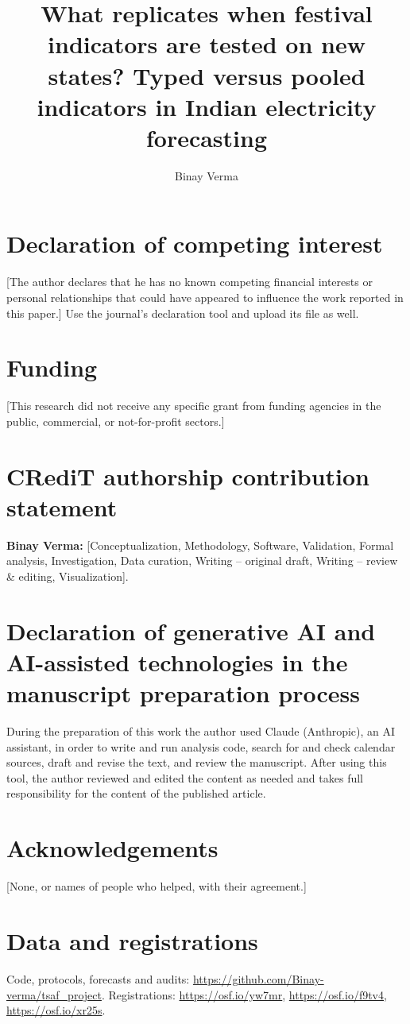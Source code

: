 \documentclass[preprint,12pt,authoryear]{elsarticle}
\begin{document}
\begin{frontmatter}
\title{What replicates when festival indicators are tested on new states? Typed versus pooled indicators in Indian electricity forecasting}
\author{Binay Verma}
\end{frontmatter}
\section*{Declaration of competing interest}
[The author declares that he has no known competing financial interests or personal relationships that could have appeared to influence the work reported in this paper.] Use the journal's declaration tool and upload its file as well.
\section*{Funding}
[This research did not receive any specific grant from funding agencies in the public, commercial, or not-for-profit sectors.]
\section*{CRediT authorship contribution statement}
\textbf{Binay Verma:} [Conceptualization, Methodology, Software, Validation, Formal analysis, Investigation, Data curation, Writing -- original draft, Writing -- review \& editing, Visualization].
\section*{Declaration of generative AI and AI-assisted technologies in the manuscript preparation process}
During the preparation of this work the author used Claude (Anthropic), an AI assistant, in order to write and run analysis code, search for and check calendar sources, draft and revise the text, and review the manuscript. After using this tool, the author reviewed and edited the content as needed and takes full responsibility for the content of the published article.
\section*{Acknowledgements}
[None, or names of people who helped, with their agreement.]
\section*{Data and registrations}
Code, protocols, forecasts and audits: \url{https://github.com/Binay-verma/tsaf_project}. Registrations: \url{https://osf.io/yw7mr}, \url{https://osf.io/f9tv4}, \url{https://osf.io/xr25s}.
\end{document}
